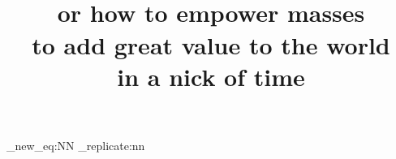 

\title{\\  \huge or how to empower masses\\to add great value to the world\\in a nick of time}


\maketitle
\newpage
\tableofcontents  
\newpage
\listoftables
\newpage
\listoffigures
\setcounter{secnumdepth}{4}


\ExplSyntaxOn
\cs_new_eq:NN \Repeat \prg_replicate:nn
\ExplSyntaxOff
\newpage

\newpage



